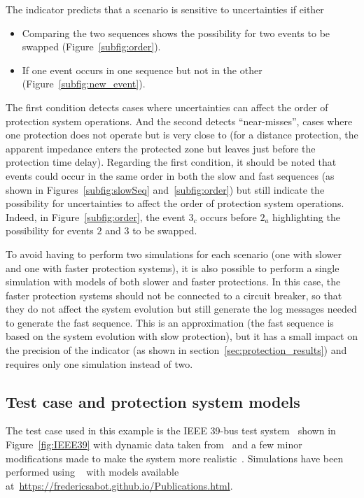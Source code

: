 The indicator predicts that a scenario is sensitive to uncertainties if either

\begin{itemize}
    \item Comparing the two sequences shows the possibility for two events to be swapped (Figure~\ref{subfig:order}).
    \item If one event occurs in one sequence but not in the other (Figure~\ref{subfig:new_event}).
\end{itemize}

The first condition detects cases where uncertainties can affect the order of protection system operations. And the second detects ``near-misses'', \ie cases where one protection does not operate but is very close to (\eg for a distance protection, the apparent impedance enters the protected zone but leaves just before the protection time delay). Regarding the first condition, it should be noted that events could occur in the same order in both the slow and fast sequences (as shown in Figures~\ref{subfig:slowSeq} and~\ref{subfig:order}) but still indicate the possibility for uncertainties to affect the order of protection system operations. Indeed, in Figure~\ref{subfig:order}, the event \(3_c\) occurs before \(2_a\) highlighting the possibility for events \(2\) and \(3\) to be swapped.

To avoid having to perform two simulations for each scenario (one with slower and one with faster protection systems), it is also possible to perform a single simulation with models of both slower and faster protections. In this case, the faster protection systems should not be connected to a circuit breaker, so that they do not affect the system evolution but still generate the log messages needed to generate the fast sequence. This is an approximation (the fast sequence is based on the system evolution with slow protection), but it has a small impact on the precision of the indicator (as shown in section~\ref{sec:protection_results}) and requires only one simulation instead of two.


\subsection{Test case and protection system models}
\label{sec:protection_test_case}

The test case used in this example is the IEEE 39-bus test system~\cite{IEEE39} shown in Figure~\ref{fig:IEEE39} with dynamic data taken from~\cite{IEEE39Dynamic} and a few minor modifications made to make the system more realistic~\cite{ISGT2023_Protections}. Simulations have been performed using \Dynawo~\cite{Dynawo} with models available at~\url{https://fredericsabot.github.io/Publications.html}.


